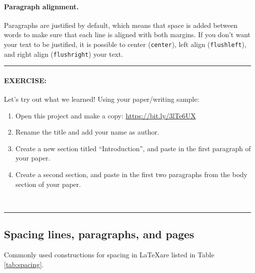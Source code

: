 \documentclass[11pt]{article}
\begin{document}
\paragraph{Paragraph alignment.} Paragraphs are justified by default, which means that space is added between words to make sure that each line is aligned with both margins. If you don't want your text to be justified, it is possible to center (\verb|center|), left align (\verb|flushleft|), and right align (\verb|flushright|) your text.
\\\vspace{0.7em}

\hrule
\paragraph{EXERCISE:} Let's try out what we learned! Using your paper/writing sample:

\begin{enumerate}[noitemsep]
    \item Open this project and make a copy: \href{https://bit.ly/3lTe6UX}{https://bit.ly/3lTe6UX}
    \item Rename the title and add your name as author.
    \item Create a new section titled ``Introduction'', and paste in the first paragraph of your paper.
    \item Create a second section, and paste in the first two paragraphs from the body section of your paper.
\end{enumerate}
\\\vspace{0.5em}
\hrule


\subsection*{Spacing lines, paragraphs, and pages}


Commonly used constructions for spacing in \LaTeX are listed in Table \ref{tab:spacing}.
\end{document}
